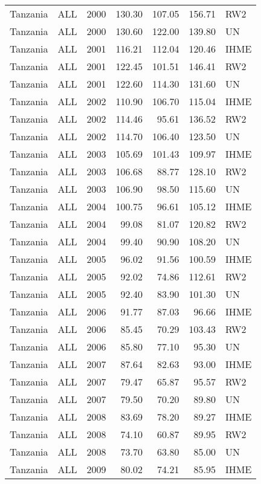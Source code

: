 \begin{longtable}{lllrrrl}
  Tanzania & ALL & 2000 & 130.30 & 107.05 & 156.71 & RW2 \\ 
  Tanzania & ALL & 2000 & 130.60 & 122.00 & 139.80 & UN \\ 
  Tanzania & ALL & 2001 & 116.21 & 112.04 & 120.46 & IHME \\ 
  Tanzania & ALL & 2001 & 122.45 & 101.51 & 146.41 & RW2 \\ 
  Tanzania & ALL & 2001 & 122.60 & 114.30 & 131.60 & UN \\ 
  Tanzania & ALL & 2002 & 110.90 & 106.70 & 115.04 & IHME \\ 
  Tanzania & ALL & 2002 & 114.46 & 95.61 & 136.52 & RW2 \\ 
  Tanzania & ALL & 2002 & 114.70 & 106.40 & 123.50 & UN \\ 
  Tanzania & ALL & 2003 & 105.69 & 101.43 & 109.97 & IHME \\ 
  Tanzania & ALL & 2003 & 106.68 & 88.77 & 128.10 & RW2 \\ 
  Tanzania & ALL & 2003 & 106.90 & 98.50 & 115.60 & UN \\ 
  Tanzania & ALL & 2004 & 100.75 & 96.61 & 105.12 & IHME \\ 
  Tanzania & ALL & 2004 & 99.08 & 81.07 & 120.82 & RW2 \\ 
  Tanzania & ALL & 2004 & 99.40 & 90.90 & 108.20 & UN \\ 
  Tanzania & ALL & 2005 & 96.02 & 91.56 & 100.59 & IHME \\ 
  Tanzania & ALL & 2005 & 92.02 & 74.86 & 112.61 & RW2 \\ 
  Tanzania & ALL & 2005 & 92.40 & 83.90 & 101.30 & UN \\ 
  Tanzania & ALL & 2006 & 91.77 & 87.03 & 96.66 & IHME \\ 
  Tanzania & ALL & 2006 & 85.45 & 70.29 & 103.43 & RW2 \\ 
  Tanzania & ALL & 2006 & 85.80 & 77.10 & 95.30 & UN \\ 
  Tanzania & ALL & 2007 & 87.64 & 82.63 & 93.00 & IHME \\ 
  Tanzania & ALL & 2007 & 79.47 & 65.87 & 95.57 & RW2 \\ 
  Tanzania & ALL & 2007 & 79.50 & 70.20 & 89.80 & UN \\ 
  Tanzania & ALL & 2008 & 83.69 & 78.20 & 89.27 & IHME \\ 
  Tanzania & ALL & 2008 & 74.10 & 60.87 & 89.95 & RW2 \\ 
  Tanzania & ALL & 2008 & 73.70 & 63.80 & 85.00 & UN \\ 
  Tanzania & ALL & 2009 & 80.02 & 74.21 & 85.95 & IHME \\ 

\end{longtable}
